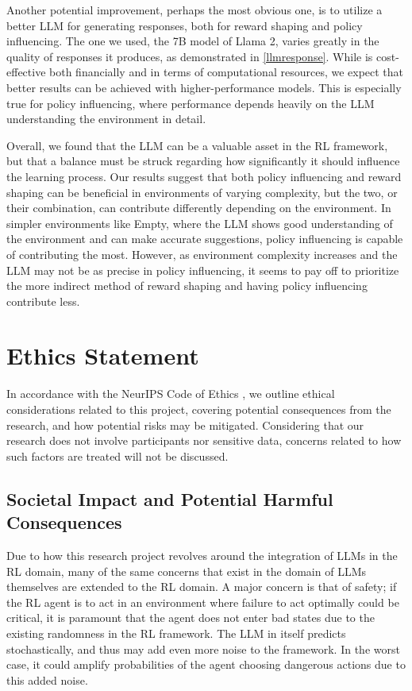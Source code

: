 \documentclass[conference]{IEEEtran}
\begin{document}
Another potential improvement, perhaps the most obvious one, is to utilize a better LLM for generating responses, both for reward shaping and policy influencing. The one we used, the 7B model of Llama 2, varies greatly in the quality of responses it produces, as demonstrated in \ref{llmresponse}. While is cost-effective both financially and in terms of computational resources, we expect that better results can be achieved with higher-performance models. This is especially true for policy influencing, where performance depends heavily on the LLM understanding the environment in detail.

Overall, we found that the LLM can be a valuable asset in the RL framework, but that a balance must be struck regarding how significantly it should influence the learning process. Our results suggest that both policy influencing and reward shaping can be beneficial in environments of varying complexity, but the two, or their combination, can contribute differently depending on the environment. In simpler environments like Empty, where the LLM shows good understanding of the environment and can make accurate suggestions, policy influencing is capable of contributing the most. However, as environment complexity increases and the LLM may not be as precise in policy influencing, it seems to pay off to prioritize the more indirect method of reward shaping and having policy influencing contribute less.

\section*{Ethics Statement}

In accordance with the NeurIPS Code of Ethics \cite{ethics}, we outline ethical considerations related to this project, covering potential consequences from the research, and how potential risks may be mitigated. Considering that our research does not involve participants nor sensitive data, concerns related to how such factors are treated will not be discussed.

\subsection*{Societal Impact and Potential Harmful Consequences}

Due to how this research project revolves around the integration of LLMs in the RL domain, many of the same concerns that exist in the domain of LLMs themselves are extended to the RL domain. A major concern is that of safety; if the RL agent is to act in an environment where failure to act optimally could be critical, it is paramount that the agent does not enter bad states due to the existing randomness in the RL framework. The LLM in itself predicts stochastically, and thus may add even more noise to the framework. In the worst case, it could amplify probabilities of the agent choosing dangerous actions due to this added noise.
\end{document}
